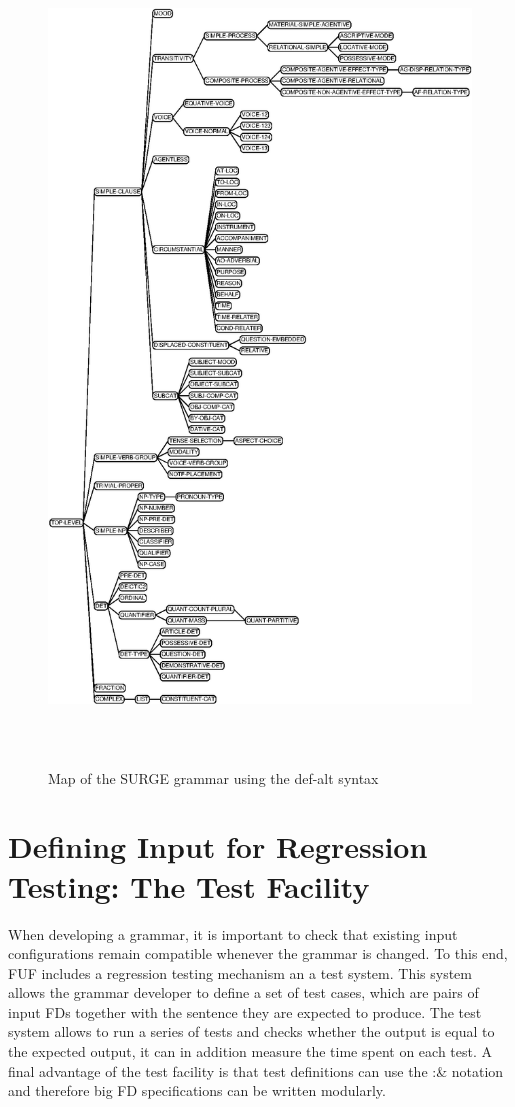 \documentclass[10pt,a4paper]{report}
\begin{document}
\begin{figure}[t]
	\centering
	\includegraphics[width=6.5 in, height=8.5in]{grammar-map.eps}
	\caption{Map of the SURGE grammar using the def-alt syntax}
\end{figure}


\chapter{Defining Input for Regression Testing: The Test Facility}

When developing a grammar, it is important to check that existing input
configurations remain compatible whenever the grammar is changed.  To this
end, FUF includes a regression testing mechanism an a test system.  This
system allows the grammar developer to define a set of test cases, which
are pairs of input FDs together with the sentence they are expected to
produce.  The test system allows to run a series of tests and checks
whether the output is equal to the expected output, it can in addition
measure the time spent on each test.  A final advantage of the test
facility is that test definitions can use the :\& notation and therefore big
FD specifications can be written modularly.
\end{document}
